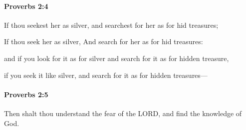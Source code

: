 		\paragraph{Proverbs 2:4} %
			\label{PROVERBS-2-4}

			If thou seekest her as silver, and searchest for her as for hid treasures;

			\begin{versebox}
					\item[BHS] 
					\item[ASV] If thou seek her as silver, And search for her as for hid treasures:
					\item[NIV] and if you look for it as for silver and search for it as for hidden treasure,
					\item[NRSV] if you seek it like silver, and search for it as for hidden treasures—
			\end{versebox}

		\paragraph{Proverbs 2:5} %
			\label{PROVERBS-2-5}

			Then shalt thou understand the fear of the LORD, and find the knowledge of God.

